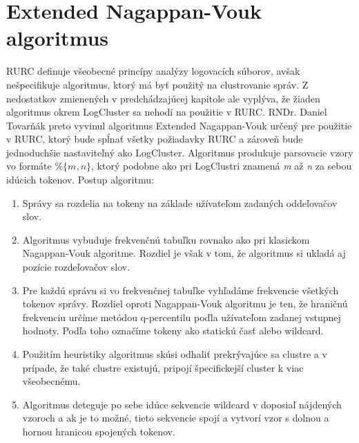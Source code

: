 \section{Extended Nagappan-Vouk algoritmus}
RURC definuje všeobecné princípy analýzy logovacích súborov, avšak nešpecifikuje algoritmus, ktorý má byť použitý na clustrovanie správ.
Z nedostatkov zmienených v predchádzajúcej kapitole ale vyplýva, že žiaden algoritmus okrem LogCluster sa nehodí na použitie v RURC.
RNDr. Daniel Tovarňák preto vyvinul algoritmus Extended Nagappan-Vouk určený pre použitie v RURC, ktorý bude spĺnať všetky požiadavky RURC a zároveň bude jednoduchšie nastaviteľný ako LogCluster. Algoritmus produkuje parsovacie vzory vo formáte $\%\{m,n\}$, ktorý podobne ako pri LogClustri znamená \emph{m} až \emph{n} za sebou idúcich tokenov. Postup algoritmu: 

\begin{enumerate}
 \item Správy sa rozdelia na tokeny na základe užívateľom zadaných oddeľovačov slov.
 \item Algoritmus vybuduje frekvenčnú tabuľku rovnako ako pri klasickom Nagappan-Vouk algoritme. Rozdiel je však v tom, že algoritmus si ukladá aj pozície rozdeľovačov slov.
 \item Pre každú správu si vo frekvenčnej tabuľke vyhľadáme frekvencie všetkých tokenov správy. Rozdiel oproti Nagappan-Vouk algoritmu je ten, že hraničnú frekvenciu určíme metódou q-percentilu poďla užívateľom zadanej vstupnej hodnoty. Podľa toho označíme tokeny ako statickú časť alebo wildcard.
 \item Použitím heuristiky algoritmus skúsi odhaliť prekrývajúce sa clustre a v prípade, že také clustre existujú, pripojí špecifickejší cluster k viac všeobecnému.
 \item Algoritmus deteguje po sebe idúce sekvencie wildcard v doposiaľ nájdených vzoroch a ak je to možné, tieto sekvencie spojí a vytvorí
 vzor s dolnou a hornou hranicou spojených tokenov.
\end{enumerate}



